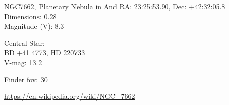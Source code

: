 \begin{block}{NGC7662, Planetary Nebula in And}
    RA: 23:25:53.90, Dec: +42:32:05.8 \\ 
    Dimensions: 0.28 \\ 
    Magnitude (V): 8.3

    Central Star: \\ 
      \hspace{1em}BD +41 4773, HD 220733 \\ 
      \hspace{1em}V-mag: 13.2 


    Finder fov: 30 

    \url{https://en.wikipedia.org/wiki/NGC_7662} 
\end{block}